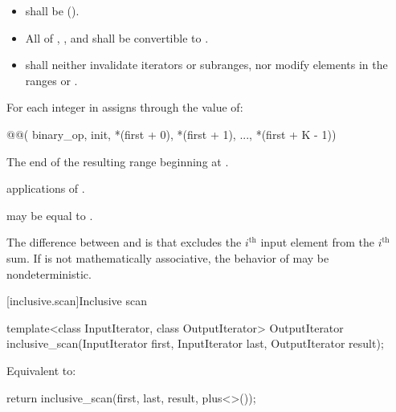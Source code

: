 \begin{itemdescr}
\pnum
\requires
\begin{itemize}
\item
   shall be  ().
\item
  All of
  ,
  ,
  and 
  shall be convertible to .
\item
   shall neither invalidate iterators or subranges,
  nor modify elements in
  the ranges  or .
\end{itemize}

\pnum
\effects
For each integer  in 
assigns through  the value of:
\begin{codeblock}
@@(
    binary_op, init, *(first + 0), *(first + 1), ..., *(first + K - 1))
\end{codeblock}

\pnum
\returns
The end of the resulting range beginning at .

\pnum
\complexity
{} applications of .

\pnum
\remarks
{} may be equal to .

\pnum
\begin{note}
The difference between  and  is
that  excludes the $i^\text{th}$ input element
from the $i^\text{th}$ sum.
If  is not mathematically associative,
the behavior of  may be nondeterministic.
\end{note}
\end{itemdescr}

[inclusive.scan]{Inclusive scan}

%
\begin{itemdecl}
template<class InputIterator, class OutputIterator>
  OutputIterator inclusive_scan(InputIterator first, InputIterator last, OutputIterator result);
\end{itemdecl}

\begin{itemdescr}
\pnum
\effects Equivalent to:
\begin{codeblock}
return inclusive_scan(first, last, result, plus<>());
\end{codeblock}
\end{itemdescr}

